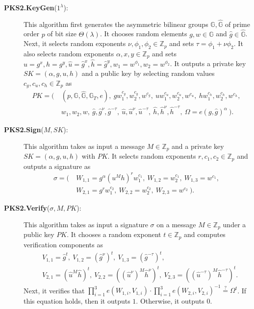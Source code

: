 \documentclass[11pt,letterpaper]{article}
\newcommand{\G}{\mathbb{G}}
\newcommand{\Z}{\mathbb{Z}}
\newcommand{\tb}[1]{\textbf{#1}}
\begin{document}
\begin{description}
\item [\tb{PKS2.KeyGen}($1^\lambda$):] This algorithm first generates the
    asymmetric bilinear groups $\G, \hat{\G}$ of prime order $p$ of bit
    size $\Theta(\lambda)$. It chooses random elements $g, w \in \G$ and
    $\hat{g} \in \hat{\G}$. Next, it selects random exponents $\nu, \phi_1,
    \phi_2 \in \Z_p$ and sets $\tau = \phi_1 + \nu \phi_2$. It also selects
    random exponents $\alpha, x, y \in \Z_p$ and sets $u = g^{x}, h =
    g^{y}, \hat{u} = \hat{g}^{x}, \hat{h} = \hat{g}^y, w_1 = w^{\phi_1},
    w_2 = w^{\phi_2}$. It outputs a private key $SK = (\alpha, g, u, h)$
    and a public key by selecting random values $c_g, c_u, c_h \in \Z_p$ as
    \begin{align*}
    PK = \Big(~
    &   (p, \G, \hat{\G}, \G_T, e),~
        g w_1^{c_g}, w_2^{c_g}, w^{c_g},~
        u w_1^{c_u}, w_2^{c_u}, w^{c_u},~
        h w_1^{c_h}, w_2^{c_h}, w^{c_h},~ \\
    &   w_1, w_2, w,~
        \hat{g}, \hat{g}^{\nu}, \hat{g}^{-\tau},~
        \hat{u}, \hat{u}^{\nu}, \hat{u}^{-\tau},~
        \hat{h}, \hat{h}^{\nu}, \hat{h}^{-\tau},~
        \Omega = e(g,\hat{g})^{\alpha}
    ~\Big).
    \end{align*}

\item [\tb{PKS2.Sign}($M, SK$):] This algorithm takes as input a message $M
    \in \Z_p$ and a private key $SK = (\alpha, g, u, h)$ with $PK$. It
    selects random exponents $r, c_1, c_2 \in \Z_p$ and outputs a signature
    as
    \begin{align*}
    \sigma = \Big(~
    &   W_{1,1} = g^{\alpha} (u^M h)^r w_1^{c_1},~
        W_{1,2} = w_2^{c_1},~
        W_{1,3} = w^{c_1},~ \\
    &   W_{2,1} = g^r w_1^{c_2},~
        W_{2,2} = w_2^{c_2},~
        W_{2,3} = w^{c_2}
    ~\Big).
    \end{align*}

\item [\tb{PKS2.Verify}($\sigma, M, PK$):] This algorithm takes as input a
    signature $\sigma$ on a message $M \in \Z_p$ under a public key $PK$.
    It chooses a random exponent $t \in \Z_p$ and computes verification
    components as
    \begin{align*}
    &   V_{1,1} = \hat{g}^t,~
        V_{1,2} = (\hat{g}^{\nu})^t,~
        V_{1,3} = (\hat{g}^{-\tau})^t,~ \\
    &   V_{2,1} = (\hat{u}^M \hat{h})^t,~
        V_{2,2} = ((\hat{u}^{\nu})^M \hat{h}^{\nu})^t,~
        V_{2,3} = ((\hat{u}^{-\tau})^M \hat{h}^{-\tau})^t.
    \end{align*}
    Next, it verifies that $\prod_{i=1}^3 e(W_{1,i}, V_{1,i}) \cdot
    \prod_{i=1}^3 e(W_{2,i}, V_{2,i})^{-1} \stackrel{?}{=} \Omega^t$. If
    this equation holds, then it outputs $1$. Otherwise, it outputs $0$.
\end{description}
\end{document}
